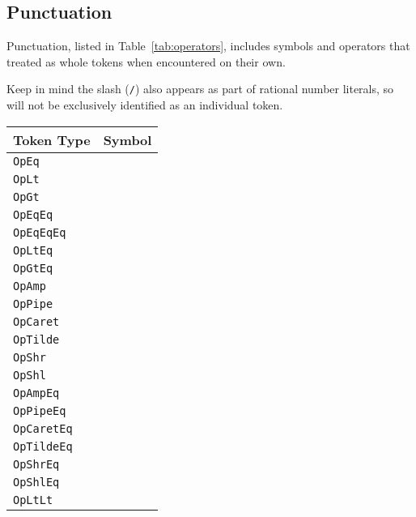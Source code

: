 \subsection{Punctuation}
\FloatBarrier

Punctuation, listed in Table~\ref{tab:operators}, includes symbols and operators that
treated as whole tokens when encountered on their own.

Keep in mind the slash (\texttt{/}) also appears as part of rational number literals, so
will not be exclusively identified as an individual token.

\begin{table}[h]
\parbox[t]{0.45\linewidth}{
    \centering
    \begin{tabular}[t]{ll}
        \hline
        \textbf{Token Type} & \textbf{Symbol} \\
        \hline
        \texttt{OpEq} & \op{=} \\
        \texttt{OpLt} & \op{<} \\
        \texttt{OpGt} & \op{>} \\
        \texttt{OpEqEq} & \op{==} \\
        \texttt{OpEqEqEq} & \op{===} \\
        \texttt{OpLtEq} & \op{<=} \\
        \texttt{OpGtEq} & \op{>=} \\
        \hline
        \texttt{OpAmp} & \op{\&} \\
        \texttt{OpPipe} & \op{|} \\
        \texttt{OpCaret} & \op{\textasciicircum} \\
        \texttt{OpTilde} & \op{\textasciitilde} \\
        \texttt{OpShr} & \op{\textasciitilde>} \\
        \texttt{OpShl} & \op{<\textasciitilde} \\
        \hline
        \texttt{OpAmpEq} & \op{\&=} \\
        \texttt{OpPipeEq} & \op{|=} \\
        \texttt{OpCaretEq} & \op{\textasciicircum=} \\
        \texttt{OpTildeEq} & \op{\textasciitilde=} \\
        \texttt{OpShrEq} & \op{\textasciitilde>=} \\
        \texttt{OpShlEq} & \op{<\textasciitilde=} \\
        \hline
        \texttt{OpLtLt} & \op{<<} \\

\end{tabular}}
\end{table}
